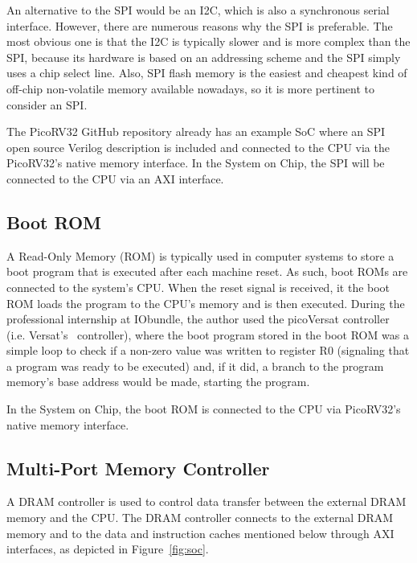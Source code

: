 An alternative to the SPI would be an I2C, which is also a synchronous serial
interface. However, there are numerous reasons why the SPI is preferable. The
most obvious one is that the I2C is typically slower and is more complex than
the SPI, because its hardware is based on an addressing scheme and the SPI
simply uses a chip select line. Also, SPI flash memory is the easiest and
cheapest kind of off-chip non-volatile memory available nowadays, so it is more
pertinent to consider an SPI.

The PicoRV32 GitHub repository already has an example SoC where an SPI open
source Verilog description is included and connected to the CPU via the
PicoRV32's native memory interface. In the \socname System on Chip, the SPI will
be connected to the CPU via an AXI interface.


\subsection{Boot ROM}
\label{subsection:bootrom}

A Read-Only Memory (ROM) is typically used in computer systems to store a boot
program that is executed after each machine reset. As such, boot ROMs are
connected to the system's CPU. When the reset signal is received, it the boot
ROM loads the program to the CPU's memory and is then executed. During the
professional internship at IObundle, the author used the picoVersat controller
(i.e. Versat's~\cite{bib:versat} controller), where the boot program stored in
the boot ROM was a simple loop to check if a non-zero value was written to
register R0 (signaling that a program was ready to be executed) and, if it did,
a branch to the program memory's base address would be made, starting the
program.

In the \socname System on Chip, the boot ROM is connected to the CPU via
PicoRV32's native memory interface.


\subsection{Multi-Port Memory Controller}
\label{subsection:memcontroller}

A DRAM controller is used to control data transfer between the external DRAM
memory and the CPU. The DRAM controller connects to the external DRAM memory and
to the data and instruction caches mentioned below through AXI interfaces, as
depicted in Figure~\ref{fig:soc}.


